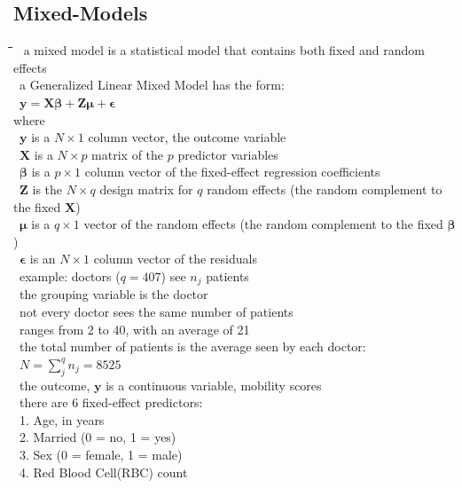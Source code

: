 \documentclass[10pt,letterpaper]{scrartcl}
\newcommand{\tbul}{\textbullet}
\newcommand{\tend}{\>\textendash}
\newcommand{\tasc}{\>\>\textasteriskcentered}
\newcommand{\tabDef}{\hspace{2em}\=\hspace{2em}\=\hspace{2em}\=\hspace{2em}\=\kill}
\begin{document}
	\subsection{Mixed-Models}\begin{tabbing}\tabDef
	\tbul\ a mixed model is a statistical model that contains both fixed and random effects \\
	\tbul\ a Generalized Linear Mixed Model has the form: \\
	\>\>\>\>\ $\mathbf{y} = \mathbf{X}\boldsymbol{\beta} + \mathbf{Z}\boldsymbol{\mu} + \boldsymbol{\epsilon}$ \\
	where \\
	\>\>\>\>\ $\mathbf{y}$ is a $N\times 1$ column vector, the outcome variable \\
	\>\>\>\>\ $\mathbf{X}$ is a $N\times p$ matrix of the $p$ predictor variables \\
	\>\>\>\>\ $\boldsymbol{\beta}$ is a $p\times 1$ column vector of the fixed-effect regression coefficients \\
	\>\>\>\>\ $\mathbf{Z}$ is the $N\times q$ design matrix for $q$ random effects (the random complement to the fixed $\mathbf{X}$) \\
	\>\>\>\>\ $\boldsymbol{\mu}$ is a $q\times 1$ vector of the random effects (the random complement to the fixed $\mathbf{\beta}$)\\
	\>\>\>\>\ $\boldsymbol{\epsilon}$ is an $N\times 1$ column vector of the residuals \\
	\tbul\ example: doctors ($q = 407$) see $n_j$ patients \\
	\tend\ the grouping variable is the doctor \\
	\tend\ not every doctor sees the same number of patients\\
	\tasc\ ranges from 2 to 40, with an average of 21\\
	\tend\ the total number of patients is the average seen by each doctor: \\
	\>\>\>\>\ $\displaystyle N = \sum_j^q n_j = 8525$\\
	\tbul\ the outcome, $\mathbf{y}$ is a continuous variable, mobility scores \\
	\tbul\ there are 6 fixed-effect predictors: \\
	\>\ 1. Age, in years\\
	\>\ 2. Married (0 = no, 1 = yes) \\
	\>\ 3. Sex (0 = female, 1 = male) \\
	\>\ 4. Red Blood Cell(RBC) count\\

\end{tabbing}
\end{document}
